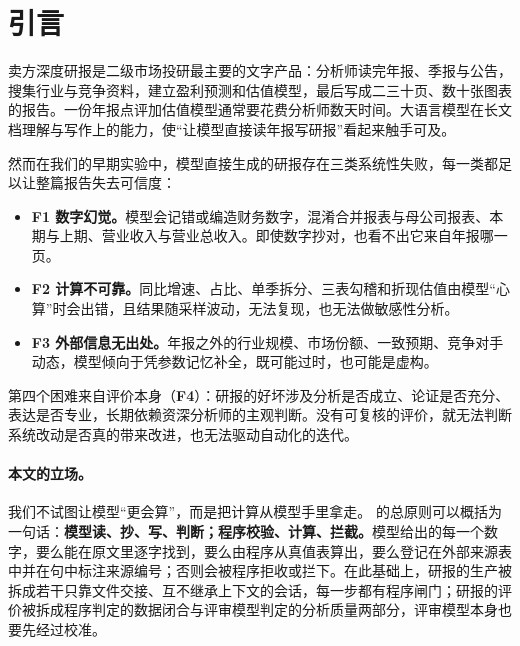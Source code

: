 \section{引言}
\label{sec:intro}

卖方深度研报是二级市场投研最主要的文字产品：分析师读完年报、季报与公告，搜集行业与竞争资料，建立盈利预测和估值模型，最后写成二三十页、数十张图表的报告。一份年报点评加估值模型通常要花费分析师数天时间。大语言模型在长文档理解与写作上的能力，使“让模型直接读年报写研报”看起来触手可及。

然而在我们的早期实验中，模型直接生成的研报存在三类系统性失败，每一类都足以让整篇报告失去可信度：

\begin{itemize}
  \item \textbf{F1 数字幻觉。}模型会记错或编造财务数字，混淆合并报表与母公司报表、本期与上期、营业收入与营业总收入。即使数字抄对，也看不出它来自年报哪一页。
  \item \textbf{F2 计算不可靠。}同比增速、占比、单季拆分、三表勾稽和折现估值由模型“心算”时会出错，且结果随采样波动，无法复现，也无法做敏感性分析。
  \item \textbf{F3 外部信息无出处。}年报之外的行业规模、市场份额、一致预期、竞争对手动态，模型倾向于凭参数记忆补全，既可能过时，也可能是虚构。
\end{itemize}

第四个困难来自评价本身（\textbf{F4}）：研报的好坏涉及分析是否成立、论证是否充分、表达是否专业，长期依赖资深分析师的主观判断。没有可复核的评价，就无法判断系统改动是否真的带来改进，也无法驱动自动化的迭代。

\paragraph{本文的立场。}我们不试图让模型“更会算”，而是把计算从模型手里拿走。\sysname{} 的总原则可以概括为一句话：\textbf{模型读、抄、写、判断；程序校验、计算、拦截。}模型给出的每一个数字，要么能在原文里逐字找到，要么由程序从真值表算出，要么登记在外部来源表中并在句中标注来源编号；否则会被程序拒收或拦下。在此基础上，研报的生产被拆成若干只靠文件交接、互不继承上下文的会话，每一步都有程序闸门；研报的评价被拆成程序判定的数据闭合与评审模型判定的分析质量两部分，评审模型本身也要先经过校准。

